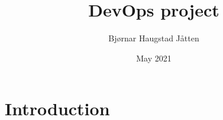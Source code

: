 \documentclass{article}
\title{DevOps project}
\author{Bjørnar Haugstad Jåtten}
\date{May 2021}
\begin{document}
\maketitle

\section{Introduction}
\end{document}
